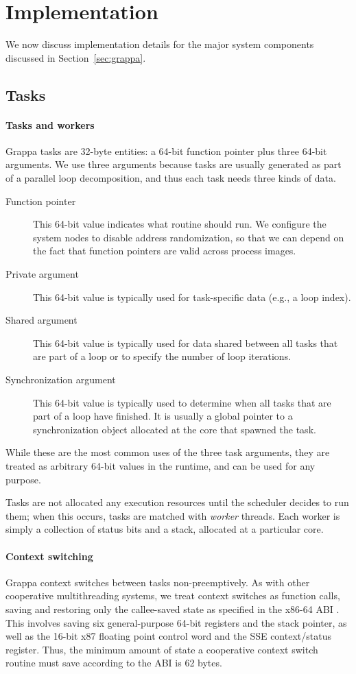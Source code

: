 \section{Implementation} \label{sec:implementation}

We now discuss implementation details for the major system components discussed in Section~\ref{sec:grappa}.

\subsection{Tasks}

\paragraph{Tasks and workers} Grappa tasks are 32-byte entities: a
64-bit function pointer plus three 64-bit arguments. We use three
arguments because tasks are usually generated as part of a parallel loop
decomposition, and thus each task needs three kinds of data.
\begin{description}
\item[Function pointer] This 64-bit value indicates what routine
  should run. We configure the system nodes to disable address randomization, so that we can depend on the fact that function pointers are valid across process images.
\item[Private argument] This 64-bit value is typically used for task-specific
  data (e.g., a loop index).
\item[Shared argument] This 64-bit value is typically used for data shared
  between all tasks that are part of a loop or to specify the number
  of loop iterations.
\item[Synchronization argument] This 64-bit value is typically used to determine
  when all tasks that are part of a loop have finished. It is usually
  a global pointer to a synchronization object allocated at the core
  that spawned the task.
\end{description}
While these are the most common uses of the three task arguments, they
are treated as arbitrary 64-bit values in the runtime, and can be used
for any purpose.

Tasks are not allocated any execution resources until the scheduler
decides to run them; when this occurs, tasks are matched with {\em
  worker} threads. Each worker is simply a collection of status bits and a
stack, allocated at a particular core.

\paragraph{Context switching} Grappa context switches between tasks
non-preemptively. As with other cooperative multithreading systems, we
treat context switches as function calls, saving and restoring only the
callee-saved state as specified in the x86-64 ABI \cite{someone}. This
involves saving six general-purpose 64-bit registers and the stack
pointer, as well as the 16-bit x87 floating point control word and the
SSE context/status register. Thus, the minimum amount of state a
cooperative context switch routine must save according to the ABI is 62
bytes.

